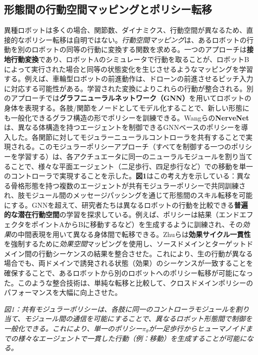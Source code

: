\documentclass[a4paper,fleqn,10pt,twocolumn]{template_v1.0}
\begin{document}
\subsection{形態間の行動空間マッピングとポリシー転移}
異種ロボットは多くの場合、関節数、ダイナミクス、行動空間が異なるため、直接的なポリシー転移は自明ではない。\textit{行動空間マッピング}は、あるロボットの行動を別のロボットの同等の行動に変換する関数を求める。一つのアプローチは\textbf{接地行動変換}であり、ロボットAのシミュレータで行動を取ることが、ロボットBによって実行された場合と同等の状態変化を生じさせるようなマッピングを学習する\cite{Hanna2017}。例えば、車輪型ロボットの前進動作は、ドローンの前進させるピッチ入力に対応する可能性がある。学習された変換によりこれらの行動が整合される。別のアプローチでは\textbf{グラフニューラルネットワーク（GNN）}を用いてロボットの身体を表現する。各肢/関節をノードとしてモデル化することで、新しい形態にも一般化できるグラフ構造の形でポリシーを訓練できる\cite{Zhu2024a}。Wangらの\textbf{NerveNet}は、異なる体構造を持つエージェントを制御できるGNNベースのポリシーを導入した。各関節に対してモジュラーニューラルコントローラを共有することで実現される\cite{Wang2017}\cite{Huang2020}\cite{Huang2020a}。このモジュラーポリシーアプローチ（すべてを制御する一つのポリシーを学習する）は、各アクチュエータに同一のニューラルモジュールを割り当てることで、様々な平面エージェント（二足歩行、四足歩行など）での移動を単一のコントローラで実現することを示した\cite{Huang2020}\cite{Huang2020a}。\textbf{図1}はこの考え方を示している：異なる骨格形態を持つ複数のエージェントが共有モジュラーポリシーで共同訓練され、肢モジュール間のメッセージパッシングを通じて形態間のスキル転移を可能にする\cite{Huang2020}\cite{Huang2020a}。GNNを超えて、研究者たちは異なるロボットの行動を比較できる\textbf{普遍的な潜在行動空間}の学習を探求している。例えば、ポリシーは結果（エンドエフェクタをポイントAからBに移動するなど）を生成するように訓練され、その\textit{効果}の中間表現を用いて異なる身体間で転移できる\cite{Zhu2024}。Zhuらは\textbf{効果サイクル一貫性}を強制するために\textit{効果空間}マッピングを使用し、ソースドメインとターゲットドメイン間の行動シーケンスの結果を整合させた\cite{Zhu2024}。これにより、生の行動が異なる場合でも、両ドメインで誘発される状態（効果）のシーケンスが一致することを確保することで、あるロボットから別のロボットへのポリシー転移が可能になった。このような整合技術は、単純な転移と比較して、クロスドメインポリシーのパフォーマンスを大幅に向上させた\cite{Zhu2024}。

\cite{Huang2020} \textit{図1：共有モジュラーポリシーは、各肢に同一のコントローラモジュールを割り当て、モジュール間の通信を可能にすることで、異なるロボット形態間で制御を一般化できる。これにより、単一のポリシー$\pi_{\theta}$が一足歩行からヒューマノイドまでの様々なエージェントで一貫した行動（例：移動）を生成することが可能になる\cite{Huang2020}\cite{Huang2020a}。}
\end{document}
